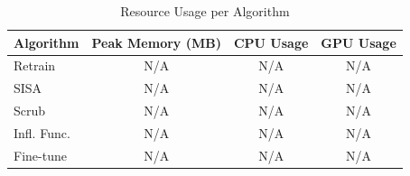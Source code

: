 \begin{table}[t]
\centering
\caption{Resource Usage per Algorithm}
\label{tab:resource_usage}
\small
\begin{tabular}{l c c c}
\toprule
Algorithm & Peak Memory (MB) & CPU Usage & GPU Usage \\
\midrule
Retrain & N/A & N/A & N/A \\
SISA & N/A & N/A & N/A \\
Scrub & N/A & N/A & N/A \\
Infl. Func. & N/A & N/A & N/A \\
Fine-tune & N/A & N/A & N/A \\
\bottomrule
\end{tabular}
\end{table}
